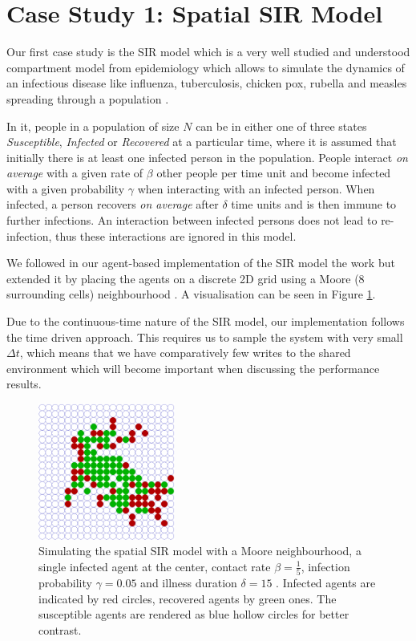 \section{Case Study 1: Spatial SIR Model} %
\label{sec:cs_sir}

Our first case study is the SIR model which is a very well studied and understood compartment model from epidemiology \cite{kermack_contribution_1927} which allows to simulate the dynamics of an infectious disease like influenza, tuberculosis, chicken pox, rubella and measles spreading through a population \cite{enns_its_2010}.

In it, people in a population of size $N$ can be in either one of three states \textit{Susceptible}, \textit{Infected} or \textit{Recovered} at a particular time, where it is assumed that initially there is at least one infected person in the population. People interact \textit{on average} with a given rate of $\beta$ other people per time unit and become infected with a given probability $\gamma$ when interacting with an infected person. When infected, a person recovers \textit{on average} after $\delta$ time units and is then immune to further infections. An interaction between infected persons does not lead to re-infection, thus these interactions are ignored in this model. 

We followed in our agent-based implementation of the SIR model the work \cite{macal_agent-based_2010} but extended it by placing the agents on a discrete 2D grid using a Moore (8 surrounding cells) neighbourhood \cite{thaler_pure_2018}. A visualisation can be seen in Figure \ref{fig:vis_sir}.

Due to the continuous-time nature of the SIR model, our implementation follows the time driven \cite{meyer_event-driven_2014} approach. This requires us to sample the system with very small $\Delta t$, which means that we have comparatively few writes to the shared environment which will become important when discussing the performance results.

\begin{figure}
	\centering
	\includegraphics[width=0.4\textwidth, angle=0]{./fig/sir/vis/SIR_Dunai_dt001_environment.png}
	\caption{Simulating the spatial SIR model with a Moore neighbourhood, a single infected agent at the center, contact rate $\beta = \frac{1}{5}$, infection probability $\gamma = 0.05$ and illness duration $\delta = 15$ . Infected agents are indicated by red circles, recovered agents by green ones. The susceptible agents are rendered as blue hollow circles for better contrast.}
	\label{fig:vis_sir}
\end{figure}

